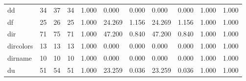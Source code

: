 \begin{longtable}{lp{1.8cm}p{1.8cm}p{1.8cm}p{1.8cm}p{1.8cm}p{1.8cm}p{1.8cm}p{1.8cm}p{1.8cm}p{1.8cm}}
dd        &                           34 &                 37 &                                34 &                                      1.000 &                                  0.000 &                                        0.000 &                             0.000 &                                   0.000 &                              1.000 &                                              1.000 \\
df        &                           25 &                 26 &                                25 &                                      1.000 &                                 24.269 &                                        1.156 &                            24.269 &                                   1.156 &                              1.000 &                                              1.000 \\
dir       &                           71 &                 75 &                                71 &                                      1.000 &                                 47.200 &                                        0.840 &                            47.200 &                                   0.840 &                              1.000 &                                              1.000 \\
dircolors &                           13 &                 13 &                                13 &                                      1.000 &                                  0.000 &                                        0.000 &                             0.000 &                                   0.000 &                              1.000 &                                              1.000 \\
dirname   &                           10 &                 10 &                                10 &                                      1.000 &                                  0.000 &                                        0.000 &                             0.000 &                                   0.000 &                              1.000 &                                              1.000 \\
du        &                           51 &                 54 &                                51 &                                      1.000 &                                 23.259 &                                        0.036 &                            23.259 &                                   0.036 &                              1.000 &                                              1.000 \\

\end{longtable}
